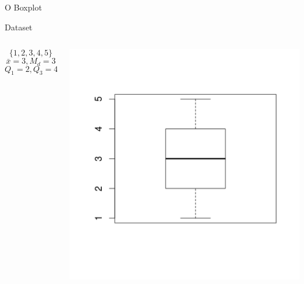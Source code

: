 \documentclass{beamer}
\begin{document}
\begin{frame}{O Boxplot}
  \begin{example}
    Dataset
    \begin{columns}
      \begin{column}{5cm}
        \begin{displaymath}
          \{1,2,3,4,5\}
        \end{displaymath}
        \begin{displaymath}
          \bar{x} = 3, M_d = 3
        \end{displaymath}
        \begin{displaymath}
          Q_1= 2, Q_3 = 4
        \end{displaymath}
      \end{column}
      \begin{column}{5cm}
        \includegraphics[height=0.6\textheight]{Desc_II/boxplot1}
      \end{column}
    \end{columns}
  \end{example}
\end{frame}
\end{document}
